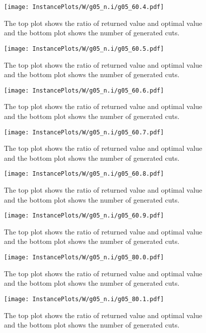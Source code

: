 \documentclass[10pt,a4paper]{article}
\begin{document}
\begin{figure}[H]
\texttt{[image: InstancePlots/W/g05\_n.i/g05\_60.4.pdf]}
\caption{The top plot shows the ratio of returned value and optimal value     and the bottom plot shows the number of generated cuts.}
\end{figure}

\begin{figure}[H]
\texttt{[image: InstancePlots/W/g05\_n.i/g05\_60.5.pdf]}
\caption{The top plot shows the ratio of returned value and optimal value     and the bottom plot shows the number of generated cuts.}
\end{figure}

\begin{figure}[H]
\texttt{[image: InstancePlots/W/g05\_n.i/g05\_60.6.pdf]}
\caption{The top plot shows the ratio of returned value and optimal value     and the bottom plot shows the number of generated cuts.}
\end{figure}

\begin{figure}[H]
\texttt{[image: InstancePlots/W/g05\_n.i/g05\_60.7.pdf]}
\caption{The top plot shows the ratio of returned value and optimal value     and the bottom plot shows the number of generated cuts.}
\end{figure}

\begin{figure}[H]
\texttt{[image: InstancePlots/W/g05\_n.i/g05\_60.8.pdf]}
\caption{The top plot shows the ratio of returned value and optimal value     and the bottom plot shows the number of generated cuts.}
\end{figure}

\begin{figure}[H]
\texttt{[image: InstancePlots/W/g05\_n.i/g05\_60.9.pdf]}
\caption{The top plot shows the ratio of returned value and optimal value     and the bottom plot shows the number of generated cuts.}
\end{figure}

\begin{figure}[H]
\texttt{[image: InstancePlots/W/g05\_n.i/g05\_80.0.pdf]}
\caption{The top plot shows the ratio of returned value and optimal value     and the bottom plot shows the number of generated cuts.}
\end{figure}

\begin{figure}[H]
\texttt{[image: InstancePlots/W/g05\_n.i/g05\_80.1.pdf]}
\caption{The top plot shows the ratio of returned value and optimal value     and the bottom plot shows the number of generated cuts.}
\end{figure}
\end{document}
